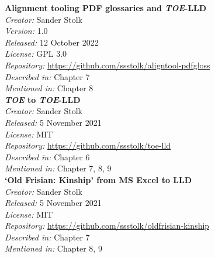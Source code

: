 \noindent 
\textbf{Alignment tooling PDF glossaries and \textit{TOE}-LLD} \\
\textit{Creator:} Sander Stolk \\
\textit{Version:} 1.0 \\
\textit{Released:} 12 October 2022 \\
\textit{License:} GPL 3.0 \\
\textit{Repository:} \url{https://github.com/ssstolk/aligntool-pdfgloss} \\
\textit{Described in:} Chapter 7 \\
\textit{Mentioned in:} Chapter 8 \\


\noindent
\textbf{\textit{TOE} to \textit{TOE}-LLD} \\
\textit{Creator:} Sander Stolk \\
\textit{Released:} 5 November 2021 \\
\textit{License:} MIT \\
\textit{Repository:} \url{https://github.com/ssstolk/toe-lld} \\
\textit{Described in:} Chapter 6 \\
\textit{Mentioned in:} Chapter 7, 8, 9 \\

\noindent
\textbf{`Old Frisian: Kinship' from MS Excel to LLD} \\
\textit{Creator:} Sander Stolk \\
\textit{Released:} 5 November 2021 \\
\textit{License:} MIT \\
\textit{Repository:} \url{https://github.com/ssstolk/oldfrisian-kinship} \\
\textit{Described in:} Chapter 7 \\
\textit{Mentioned in:} Chapter 8, 9 \\



